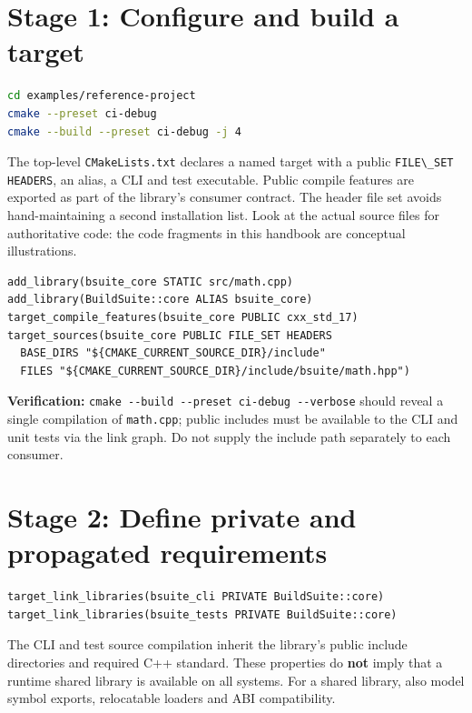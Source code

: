 \documentclass[11pt,letterpaper,oneside]{report}
\providecommand{\passthrough}[1]{#1}
\begin{document}
\chapter{Stage 1: Configure and build a
target}\label{stage-1-configure-and-build-a-target}

\begin{lstlisting}[language=sh]
cd examples/reference-project
cmake --preset ci-debug
cmake --build --preset ci-debug -j 4
\end{lstlisting}

The top-level \passthrough{\lstinline!CMakeLists.txt!} declares a named
target with a public \passthrough{\lstinline!FILE\_SET HEADERS!}, an
alias, a CLI and test executable. Public compile features are exported
as part of the library's consumer contract. The header file set avoids
hand-maintaining a second installation list. Look at the actual source
files for authoritative code: the code fragments in this handbook are
conceptual illustrations.

\begin{lstlisting}
add_library(bsuite_core STATIC src/math.cpp)
add_library(BuildSuite::core ALIAS bsuite_core)
target_compile_features(bsuite_core PUBLIC cxx_std_17)
target_sources(bsuite_core PUBLIC FILE_SET HEADERS
  BASE_DIRS "${CMAKE_CURRENT_SOURCE_DIR}/include"
  FILES "${CMAKE_CURRENT_SOURCE_DIR}/include/bsuite/math.hpp")
\end{lstlisting}

\textbf{Verification:}
\passthrough{\lstinline!cmake --build --preset ci-debug --verbose!}
should reveal a single compilation of
\passthrough{\lstinline!math.cpp!}; public includes must be available to
the CLI and unit tests via the link graph. Do not supply the include
path separately to each consumer.

\chapter{Stage 2: Define private and propagated
requirements}\label{stage-2-define-private-and-propagated-requirements}

\begin{lstlisting}
target_link_libraries(bsuite_cli PRIVATE BuildSuite::core)
target_link_libraries(bsuite_tests PRIVATE BuildSuite::core)
\end{lstlisting}

The CLI and test source compilation inherit the library's public include
directories and required C++ standard. These properties do \textbf{not}
imply that a runtime shared library is available on all systems. For a
shared library, also model symbol exports, relocatable loaders and ABI
compatibility.
\end{document}
